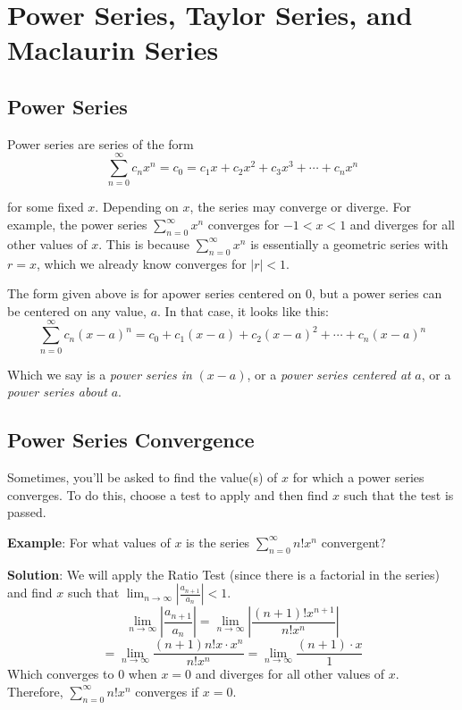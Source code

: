 \chapter{Power Series, Taylor Series, and Maclaurin Series}

\section{Power Series}
Power series are series of the form 
$$\sum_{n=0}^\infty c_n x^n = c_0 = c_1 x + c_2 x^2 + c_3 x^3 + \cdots + c_n 
x^n$$

for some fixed $x$. Depending on $x$, the series may converge or diverge. For 
example, the power series $\sum_{n=0}^\infty x^n$ converges for $ -1 < x < 1$ 
and diverges for all other values of $x$. This is because $\sum_{n=0}^\infty 
x^n$ is essentially a geometric series with $r = x$, which we already know 
converges for $|r|<1$. 

The form given above is for apower series centered on $0$, but a power series 
can be centered on any value, $a$. In that case, it looks like this:
$$\sum_{n=0}^\infty c_n (x - a)^n = c_0 + c_1(x - a) + c_2(x - a)^2 + \cdots + 
c_n(x - a)^n$$

Which we say is a \textit{power series in }$(x - a)$, or a \textit{power 
series centered at }$a$, or a \textit{power series about }$a$. 

\section{Power Series Convergence}
Sometimes, you'll be asked to find the value(s) of $x$ 
for which a power series converges. To do this, choose a test to apply and 
then find $x$ such that the test is passed. 

\textbf{Example}: For what values of $x$ is the series $\sum_{n=0}^\infty n!x^n$ 
convergent?

\textbf{Solution}: We will apply the Ratio Test (since there is a factorial in 
the series) and find $x$ such that $\lim_{n \to \infty} \left| \frac{a_{n+1}}{
a_n} \right| < 1$. 
$$\lim_{n \to \infty} \left| \frac{a_{n + 1}}{a_n} \right| = \lim_{n \to 
\infty} \left| \frac{(n+1)!x^{n+1}}{n!x^n} \right|$$
$$= \lim_{n \to \infty} \frac{(n+1) n! x \cdot x^n}{n!x^n} = \lim_{n \to 
\infty} \frac{(n+1) \cdot x}{1}$$
Which converges to $0$ when $x=0$ and diverges for all other values of $x$. 
Therefore, $\sum_{n=0}^\infty n!x^n$ converges if $x=0$. 

